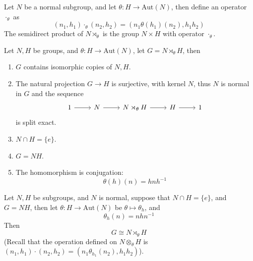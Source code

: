 \documentclass[openany]{book}
\begin{document}
\begin{defn}
    Let $N$ be a normal subgroup, and let $\theta: H\to\text{Aut}(N)$, then define an operator $\cdot_\theta$ as 
    \begin{equation*}
        (n_1,h_1)\cdot_\theta(n_2,h_2)=(n_1\theta(h_1)(n_2), h_1h_2)
    \end{equation*}
    The semidirect product of $N\rtimes_\theta$ is the group $N\times H$ with operator $\cdot_\theta$.
\end{defn}

\begin{thm}
    Let $N,H$ be groups, and $\theta: H\to\text{Aut}(N)$, let $G=N\rtimes_\theta H$, then 
    \begin{enumerate}
        \item $G$ contains isomorphic copies of $N,H$.
        \item The natural projection $G\to H$ is surjective, with kernel $N$, thus $N$ is normal in $G$ and the sequence 
        \[\begin{tikzcd}
            1 & N & {N\rtimes_\theta H} & H & 1
            \arrow[from=1-1, to=1-2]
            \arrow[from=1-2, to=1-3]
            \arrow[from=1-3, to=1-4]
            \arrow[from=1-4, to=1-5]
        \end{tikzcd}\]
        is split exact.
        \item $N\cap H=\{e\}$.
        \item $G=NH$.
        \item The homomorphism is conjugation: 
        \begin{equation*}
            \theta(h)(n)=hnh^{-1}
        \end{equation*}
    \end{enumerate}
\end{thm}

\begin{prop}[*]
    Let $N,H$ be subgroups, and $N$ is normal, suppose that $N\cap H=\{e\}$, and $G=NH$, then let $\theta: H\to\text{Aut}(N)$ be $\theta\mapsto\theta_h$, and 
    \begin{equation*}
        \theta_h(n)=nhn^{-1}
    \end{equation*}
    Then 
    \begin{equation*}
        G\cong N\rtimes_\theta H
    \end{equation*}
    (Recall that the operation defined on $N\otimes_\theta H$ is $(n_1,h_1)\cdot(n_2,h_2)=(n_1\theta_{h_1}(n_2), h_1h_2)$). 
\end{prop}
\end{document}
